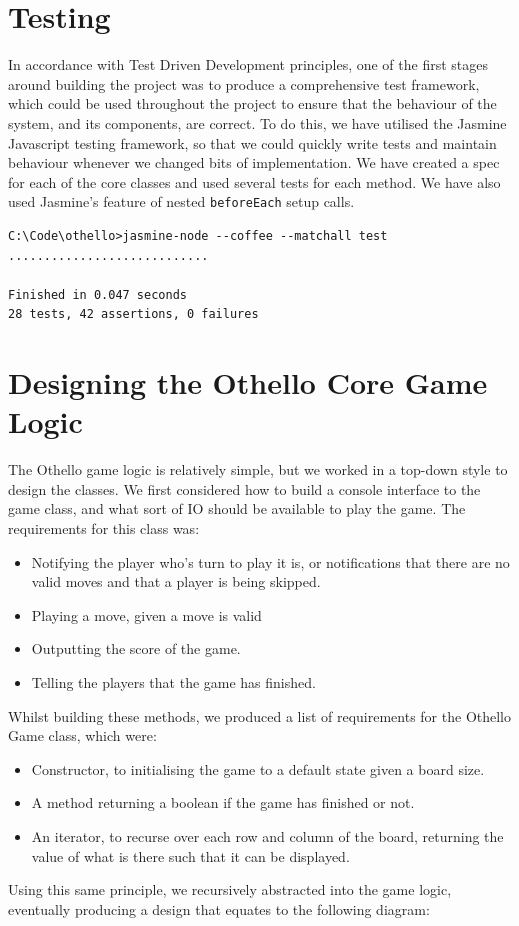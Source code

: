 \documentclass[a4wide, 11pt]{article}
\begin{document}
\section{Testing}
In accordance with Test Driven Development principles, one of the first stages around building the project was to produce a comprehensive test framework, which could be used throughout the project to ensure that the behaviour of the system, and its components, are correct. To do this, we have utilised the Jasmine Javascript testing framework, so that we could quickly write tests and maintain behaviour whenever we changed bits of implementation. We have created a spec for each of the core classes and used several tests for each method. We have also used Jasmine's feature of nested \texttt{beforeEach} setup calls.

\begin{verbatim}
C:\Code\othello>jasmine-node --coffee --matchall test
............................

Finished in 0.047 seconds
28 tests, 42 assertions, 0 failures
\end{verbatim}

\section{Designing the Othello Core Game Logic}

The Othello game logic is relatively simple, but we worked in a top-down style to design the classes. We first considered how to build a console interface to the game class, and what sort of IO should be available to play the game. The requirements for this class was:
\begin{itemize}
\item Notifying the player who's turn to play it is, or notifications that there are no valid moves and that a player is being skipped.
\item Playing a move, given a move is valid
\item Outputting the score of the game.
\item Telling the players that the game has finished.
\end{itemize}
Whilst building these methods, we produced a list of requirements for the Othello Game class, which were:
\begin{itemize}
\item Constructor, to initialising the game to a default state given a board size.
\item A method returning a boolean if the game has finished or not.
\item An iterator, to recurse over each row and column of the board, returning the value of what is there such that it can be displayed.
\end{itemize}
Using this same principle, we recursively abstracted into the game logic, eventually producing a design that equates to the following diagram:
\end{document}
